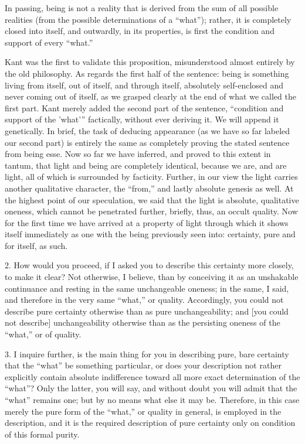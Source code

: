 In passing, being is not a reality that is
derived from the sum of all possible realities
(from the possible determinations of a “what”);
rather, it is completely closed into itself,
and outwardly, in its properties, is
first the condition and support of every “what.”

Kant was the first to validate this proposition,
misunderstood almost entirely by the old philosophy.
As regards the first half of the sentence:
being is something living
from itself, out of itself, and through itself,
absolutely self-enclosed and never coming out of itself,
as we grasped clearly at the end of what we called the first part.
Kant merely added the second part of the sentence,
“condition and support of the 'what'”
factically, without ever deriving it.
We will append it genetically.
In brief, the task of deducing appearance
(as we have so far labeled our second part)
is entirely the same as completely proving the
stated sentence from being {esse}.
Now so far we have inferred,
and proved to this extent {in tantum},
that light and being are completely identical,
because we are, and are light,
all of which is surrounded by facticity.
Further, in our view the light carries
another qualitative character, the “from,”
and lastly absolute genesis as well.
At the highest point of our speculation,
we said that the light is absolute, qualitative oneness,
which cannot be penetrated further,
briefly, thus, an occult quality.
Now for the first time we have arrived
at a property of light through which it shows itself
immediately as one with the being previously seen into:
certainty, pure and for itself, as such.

2. How would you proceed, if I asked you
to describe this certainty more closely, to make it clear?
Not otherwise, I believe, than by conceiving it
as an unshakable continuance and resting
in the same unchangeable oneness;
in the same, I said, and therefore
in the very same “what,” or quality.
Accordingly, you could not describe pure certainty otherwise
than as pure unchangeability;
and [you could not describe] unchangeability otherwise
than as the persisting oneness of the “what,” or of quality.

3. I inquire further, is the main thing for you
in describing pure, bare certainty
that the “what” be something particular,
or does your description not rather explicitly contain
absolute indifference toward all more exact determination of the “what”?
Only the latter, you will say, and without doubt
you will admit that the “what” remains one;
but by no means what else it may be.
Therefore, in this case merely the pure form of the “what,”
or quality in general, is employed in the description,
and it is the required description of pure certainty
only on condition of this formal purity.

